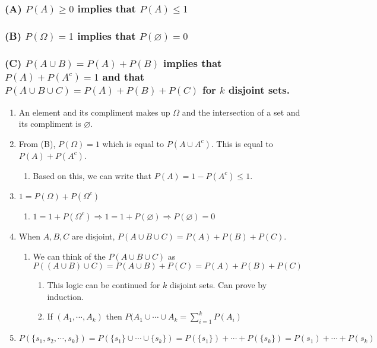 \documentclass[11pt]{article}
\begin{document}
\subsubsection{(A) \(P(A)\ge 0\) implies that \(P(A)\le 1\)}
\label{sec:org22900d3}
\subsubsection{(B) \(P(\Omega)=1\) implies that \(P(\varnothing)=0\)}
\label{sec:orge4d3628}
\subsubsection{(C) \(P(A\cup B)=P(A)+P(B)\) implies that \(P(A)+P(A^c)=1\) and that \(P(A\cup B\cup C)=P(A)+P(B)+P(C)\) for \(k\) disjoint sets.}
\label{sec:orgb2397a3}
\begin{enumerate}
\item An element and its compliment makes up \(\Omega\) and the intersection of a set and its compliment is \(\varnothing\).
\label{sec:org0b6733b}
\item From (B), \(P(\Omega)=1\) which is equal to \(P(A\cup A^c)\). This is equal to \(P(A)+P(A^c)\).
\label{sec:orgc8cb3c9}
\begin{enumerate}
\item Based on this, we can write that \(P(A)=1-P(A^c)\le 1\).
\label{sec:orgf683756}
\end{enumerate}
\item \(1=P(\Omega)+P(\Omega^c)\)
\label{sec:orgc2fc87a}
\begin{enumerate}
\item \(1=1+P(\Omega^c) \Rightarrow 1=1+P(\varnothing)\Rightarrow P(\varnothing)=0\)
\label{sec:org9ada5be}
\end{enumerate}
\item When \(A,B,C\) are disjoint, \(P(A\cup B\cup C)=P(A)+P(B)+P(C)\).
\label{sec:org1445614}
\begin{enumerate}
\item We can think of the \(P(A\cup B\cup C)\) as \(P((A\cup B)\cup C)=P(A\cup B)+P(C)=P(A)+P(B)+P(C)\)
\label{sec:org10fd1b4}
\begin{enumerate}
\item This logic can be continued for \(k\) disjoint sets. Can prove by induction.
\label{sec:orgdd5f51a}
\item If \((A_1,\cdots ,A_k)\) then \(P(A_1\cup \cdots \cup A_k = \sum_{i=1}^{k}P(A_i)\)
\label{sec:org712cf12}
\end{enumerate}
\end{enumerate}
\item \(P(\{s_1,s_2,\cdots,s_k\}) = P(\{s_1\}\cup\cdots \cup \{s_k\}) = P(\{s_1\})+\cdots + P(\{s_k\})=P(s_1)+\cdots + P(s_k)\)
\label{sec:org9e596f5}
\end{enumerate}
\end{document}
